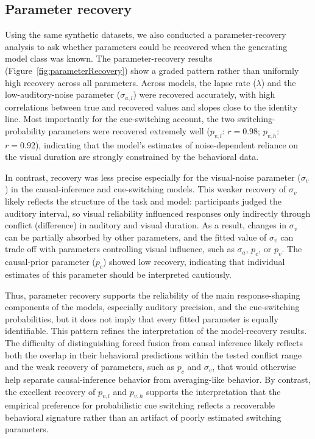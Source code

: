 \documentclass{jov}
\begin{document}
\subsection{Parameter recovery}

Using the same synthetic datasets, we also conducted a parameter-recovery analysis to ask whether parameters could be recovered when the generating model class was known. The parameter-recovery results (Figure~\ref{fig:parameterRecovery}) show a graded pattern rather than uniformly high recovery across all parameters. Across models, the lapse rate ($\lambda$) and the low-auditory-noise parameter ($\sigma_{a,l}$) were recovered accurately, with high correlations between true and recovered values and slopes close to the identity line. Most importantly for the cue-switching account, the two switching-probability parameters were recovered extremely well ($p_{v,l}$: $r = 0.98$; $p_{v,h}$: $r = 0.92$), indicating that the model's estimates of noise-dependent reliance on the visual duration are strongly constrained by the behavioral data.

In contrast, recovery was less precise especially for the visual-noise parameter ($\sigma_v$) in the causal-inference and cue-switching models. This weaker recovery of $\sigma_v$ likely reflects the structure of the task and model: participants judged the auditory interval, so visual reliability influenced responses only indirectly through conflict (difference) in auditory and visual duration. As a result, changes in $\sigma_v$ can be partially absorbed by other parameters, and the fitted value of $\sigma_v$ can trade off with parameters controlling visual influence, such as $\sigma_a$, $p_c$, or $p_v$. The causal-prior parameter ($p_c$) showed low recovery, indicating that individual estimates of this parameter should be interpreted cautiously.

Thus, parameter recovery supports the reliability of the main response-shaping components of the models, especially auditory precision, and the cue-switching probabilities, but it does not imply that every fitted parameter is equally identifiable. This pattern refines the interpretation of the model-recovery results. The difficulty of distinguishing forced fusion from causal inference likely reflects both the overlap in their behavioral predictions within the tested conflict range and the weak recovery of parameters, such as $p_c$ and $\sigma_v$, that would otherwise help separate causal-inference behavior from averaging-like behavior. By contrast, the excellent recovery of $p_{v,l}$ and $p_{v,h}$ supports the interpretation that the empirical preference for probabilistic cue switching reflects a recoverable behavioral signature rather than an artifact of poorly estimated switching parameters.
\end{document}
